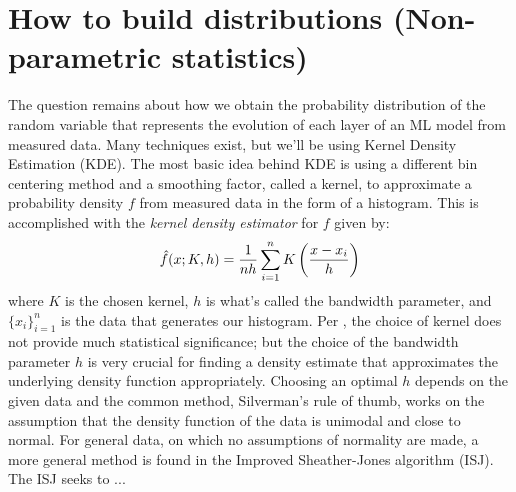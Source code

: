 \section{How to build distributions (Non-parametric statistics)}
The question remains about how we obtain the probability distribution of the random 
variable that represents the evolution of each layer of an ML model from measured data. 
Many techniques exist, but we'll be using Kernel Density Estimation (KDE). The most 
basic idea behind KDE is using a different bin centering method and a smoothing factor, 
called a kernel, to approximate a probability density $f$ from measured data in the form 
of a histogram. This is accomplished with the \emph{kernel density estimator} for $f$
given by:
$$\hat{f}(x; K, h) = \frac{1}{nh}\sum_{i = 1}^n K\left(\frac{x - x_i}{h}\right)$$
where $K$ is the chosen kernel, $h$ is what's called the bandwidth parameter, and 
$\{x_i\}_{i=1}^n$ is the data that generates our histogram. Per \cite{epanechnikov}, 
the choice of kernel does not provide much statistical significance; but the choice of 
the bandwidth parameter $h$ is very crucial for finding a density estimate that 
approximates the 
underlying density function appropriately. Choosing an optimal $h$ depends on 
the given data and the common method, Silverman's rule of thumb, works on the 
assumption that the density function of the data is unimodal and close to 
normal. For general data, on which no assumptions of normality are made, a more 
general method is found in the Improved Sheather-Jones algorithm (ISJ)\cite{botev}. 
The ISJ seeks to ...

